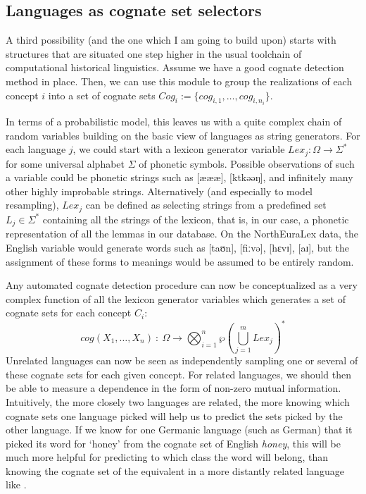 \subsection{Languages as cognate set selectors}
A third possibility (and the one which I am going to build upon) starts with structures that are situated one step higher in the usual toolchain of computational historical linguistics. Assume we have a good cognate detection method in place. Then, we can use this module to group the realizations of each concept $i$ into a set of cognate sets $Cog_i := \{cog_{i,1}, \dots, cog_{i,n_{i}}\}$.

In terms of a probabilistic model, this leaves us with a quite complex chain of random variables building on the basic view of languages as string generators. For each language $j$, we could start with a lexicon generator variable $Lex_j \colon \Omega \rightarrow \Sigma^*$ for some universal alphabet $\Sigma$ of phonetic symbols. Possible observations of such a variable could be phonetic strings such as [æææ], [ktkəəŋ], and infinitely many other highly improbable strings. Alternatively (and especially to model resampling), $Lex_j$ can be defined as selecting strings from a predefined set $L_j \in \Sigma^*$ containing all the strings of the lexicon, that is, in our case, a phonetic representation of all the lemmas in our database. On the NorthEuraLex data, the English variable would generate words such as [taʊn], [fiːvə], [hɛvɪ], [aɪ], but the assignment of these forms to meanings would be assumed to be entirely random.

Any automated cognate detection procedure can now be conceptualized as a very complex function of all the lexicon generator variables which generates a set of cognate sets for each concept $C_i$:
\begin{equation}
 cog(X_1,\dots,X_n)\ \colon\ \Omega \rightarrow \bigotimes_{i = 1}^{n} \wp\left(\bigcup_{j=1}^{m} Lex_j\right)^*
\end{equation}
Unrelated languages can now be seen as independently sampling one or several of these cognate sets for each given concept. For related languages, we should then be able to measure a dependence in the form of non-zero mutual information. Intuitively, the more closely two languages are related, the more knowing which cognate sets one language picked will help us to predict the sets picked by the other language. If we know for one Germanic language (such as German) that it picked its word for `honey' from the cognate set of English \textit{honey}, this will be much more helpful for predicting to which class the  word will belong, than knowing the cognate set of the equivalent in a more distantly related language like .

